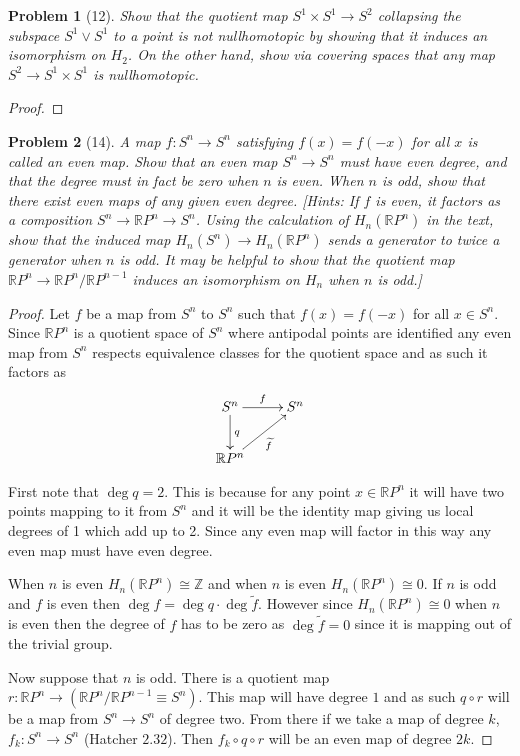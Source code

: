 \documentclass[10pt]{article}
\newcommand{\sk}{\vskip 10mm}
\newcommand{\bb}[1]{\mathbb{#1}}
\theoremstyle{plain}
\newtheorem{problem}{Problem}
\theoremstyle{remark}
\begin{document}
\begin{problem}[12]
  Show that the quotient map $S^1\times S^1\rightarrow S^2$ collapsing the
  subspace $S^1\vee S^1$ to a point is not nullhomotopic
  by showing that it induces an isomorphism on $H_2$. On the
  other hand, show via covering spaces that any map
  $S^2\rightarrow S^1\times S^1$ is nullhomotopic.
\end{problem}

\begin{proof}
  
\end{proof}

\sk

\begin{problem}[14]
  A map $f:S^n\rightarrow S^n$ satisfying $f(x)=f(-x)$ for all $x$ is called
  an even map. Show that an even map $S^n\rightarrow S^n$ must have even
  degree, and that the degree must in fact be zero when $n$ is even.
  When $n$ is odd, show that there exist even maps of any given even
  degree. [Hints: If $f$ is even, it factors as a composition
  $S^n\rightarrow\bb{R}P^n\rightarrow S^n$. Using the calculation of
  $H_n(\bb{R}P^n)$ in the text, show that the induced map
  $H_n(S^n)\rightarrow H_n(\bb{R}P^n)$ sends a generator to twice a
  generator when $n$ is odd. It may be helpful to show that the
  quotient map $\bb{R}P^n\rightarrow \bb{R}P^n/\bb{R}P^{n-1}$ induces an
  isomorphism on $H_n$ when $n$ is odd.]
\end{problem}

\begin{proof}
    Let $f$ be a map from $S^n$ to $S^n$ such that $f(x)=f(-x)$ for all $x\in S^n$.
  Since $\bb{R}P^n$ is a quotient space of $S^n$ where antipodal points are
  identified any even map from $S^n$ respects equivalence classes for the
  quotient space and as such it factors as
  \[
    \xymatrix{
      S^n \ar[d]^q \ar[r]^f & S^n\\
      \bb{R}P^n \ar[ru]_{\widetilde{f}}
    }
  \]

  First note that $\deg q =2$. This is because
  for any point $x\in\bb{R}P^n$ it will have two points mapping to it from $S^n$ and
  it will be the identity map giving us local degrees of 1 which add up to 2. Since
  any even map will factor in this way any even map must have even degree.
  
  When $n$ is even $H_n(\bb{R}P^n)\cong\bb{Z}$ and when $n$ is even $H_n(\bb{R}P^n)\cong 0$.
  If $n$ is odd and $f$ is even then $\deg f = \deg q\cdot\deg \widetilde{f}$. However
  since $H_n(\bb{R}P^n)\cong 0$ when $n$ is even then the degree of $f$ has to be zero
  as $\deg \widetilde{f}=0$ since it is mapping out of the trivial group.

  Now suppose that $n$ is odd. There is a quotient map
  $r:\bb{R}P^n\rightarrow (\bb{R}P^n/\bb{R}P^{n-1}\equiv S^n)$. This map will have degree $1$ and
  as such $q\circ r$ will be a map from $S^n\rightarrow S^n$ of degree two. From there if we
  take a map of degree $k$, $f_k:S^n\rightarrow S^n$ (Hatcher $2.32$). Then $f_k\circ q\circ r$ will be
  an even map of degree $2k$.
\end{proof}
\end{document}
